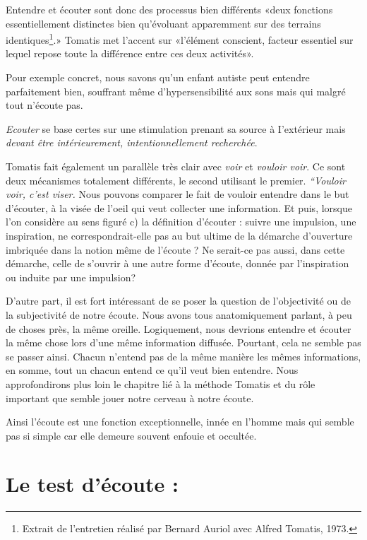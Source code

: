 Entendre et écouter sont donc des processus bien différents «deux
fonctions essentiellement distinctes bien qu'évoluant apparemment
sur des terrains identiques\footnote{Extrait de l'entretien réalisé par Bernard Auriol avec Alfred Tomatis, 1973.}.» Tomatis met l'accent sur «l'élément
conscient, facteur essentiel sur lequel repose toute la différence
entre ces deux activités».

Pour exemple concret, nous savons qu'un enfant autiste peut entendre
parfaitement bien, souffrant même d'hypersensibilité aux sons mais
qui malgré tout n'écoute pas.

\emph{Ecouter} se base certes sur une stimulation prenant sa source
à I'extérieur mais \emph{devant être intérieurement, intentionnellement
recherchée}.

Tomatis fait également un parallèle très clair avec \emph{voir} et \emph{vouloir voir}. Ce sont deux mécanismes totalement différents, le second
utilisant le premier. \emph{``Vouloir voir, c'est viser.} Nous pouvons comparer le fait de vouloir entendre dans le but d'écouter, à la visée de l'oeil qui veut collecter une information.
Et puis, lorsque l'on considère au sens figuré c) la définition d'écouter
: suivre une impulsion, une inspiration, ne correspondrait-elle pas
au but ultime de la démarche d'ouverture imbriquée dans la notion
même de l'écoute ? Ne serait-ce pas aussi, dans cette démarche, celle
de s'ouvrir à une autre forme d'écoute, donnée par l'inspiration ou
induite par une impulsion? 

D'autre part, il est fort intéressant de se poser la question de l'objectivité
ou de la subjectivité de notre écoute. Nous avons tous anatomiquement
parlant, à peu de choses près, la même oreille. Logiquement, nous
devrions entendre et écouter la même chose lors d'une même information
diffusée. Pourtant, cela ne semble pas se passer ainsi. Chacun n'entend
pas de la même manière les mêmes informations, en somme, tout un chacun
entend ce qu'il veut bien entendre. Nous approfondirons plus loin
le chapitre lié à la méthode Tomatis et du rôle important que semble
jouer notre cerveau à notre écoute. 

Ainsi l'écoute est une fonction exceptionnelle, innée en l'homme mais
qui semble pas si simple car elle demeure souvent enfouie et occultée.

\section{Le test d'écoute :}

